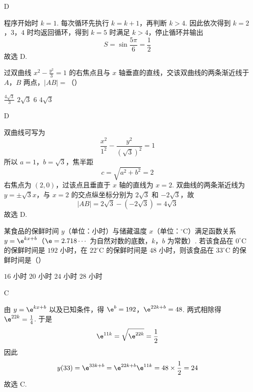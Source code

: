 \begin{answer}
D
\end{answer}

\begin{solution}
程序开始时 \(k=1\). 每次循环先执行 \(k=k+1\)，再判断 \(k>4\). 因此依次得到 \(k=2\)，\(3\)，\(4\) 时均返回循环，得到 \(k=5\) 时满足 \(k>4\)，停止循环并输出
\[
S=\sin\frac{5\pi}{6}=\frac12
\]
故选 D.
\end{solution}

\begin{problem}
过双曲线 \(x^{2}-\frac{y^{2}}{3}=1\) 的右焦点且与 \(x\) 轴垂直的直线，交该双曲线的两条渐近线于 \(A\)，\(B\) 两点，\(|AB|=\)（\quad）

\choices
    {\(\frac{4\sqrt{3}}{3}\)}
    {\(2 \sqrt{3}\)}
    {\(6\)}
    {\(4 \sqrt{3}\)}
\end{problem}

\begin{answer}
D
\end{answer}

\begin{solution}
双曲线可写为
\[
\frac{x^2}{1^2}-\frac{y^2}{(\sqrt3)^2}=1
\]
所以 \(a=1\)，\(b=\sqrt3\)，焦半距
\[
c=\sqrt{a^2+b^2}=2
\]
右焦点为 \((2,0)\)，过该点且垂直于 \(x\) 轴的直线为 \(x=2\). 双曲线的两条渐近线为 \(y=\pm\sqrt3x\)，与 \(x=2\) 的交点纵坐标分别为 \(2\sqrt3\) 和 \(-2\sqrt3\)，故
\[
|AB|=2\sqrt3-(-2\sqrt3)=4\sqrt3
\]
故选 D.
\end{solution}

\begin{problem}
某食品的保鲜时间 \(y\)（单位：\(\text{小时}\)）与储藏温度 \(x\)（单位：\(^{\circ}\mathrm{C}\)）满足函数关系 \(y=\e^{kx+b}\)（\(\e = 2.718\cdots\) 为自然对数的底数，\(k\)，\(b\) 为常数）. 若该食品在 \(0^{\circ}\mathrm{C}\) 的保鲜时间是 \(192\text{ 小时}\)，在 \(22^{\circ}\mathrm{C}\) 的保鲜时间是 \(48\text{ 小时}\)，则该食品在 \(33^{\circ}\mathrm{C}\) 的保鲜时间是（\quad）

\choices
    {\(16\text{ 小时}\)}
    {\(20\text{ 小时}\)}
    {\(24\text{ 小时}\)}
    {\(28\text{ 小时}\)}
\end{problem}

\begin{answer}
C
\end{answer}

\begin{solution}
由 \(y=\e^{kx+b}\) 以及已知条件，得
\(\e^b=192\)，\(\e^{22k+b}=48\).
两式相除得 \(\e^{22k}=\frac14\). 于是
\[
\e^{11k}=\sqrt{\e^{22k}}=\frac12
\]
因此
\[
y(33)=\e^{33k+b}=\e^{22k+b}\e^{11k}=48\times\frac12=24
\]
故选 C.
\end{solution}

